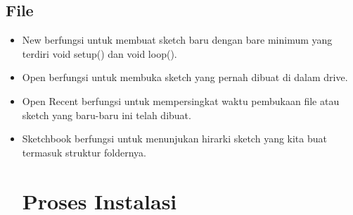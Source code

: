 \subsection{File}
\begin{itemize}
\item New berfungsi untuk membuat sketch baru dengan bare minimum yang terdiri void setup() dan void loop(). 
\item Open berfungsi untuk membuka sketch yang pernah dibuat di dalam drive.
\item Open Recent berfungsi untuk mempersingkat waktu pembukaan file atau sketch yang baru-baru ini telah dibuat.
\item Sketchbook berfungsi untuk menunjukan hirarki sketch yang kita buat termasuk struktur foldernya.







\section{Proses Instalasi}


\end{itemize}
